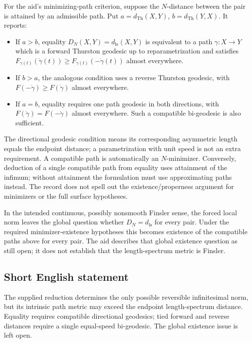 \documentclass[11pt]{article}
\begin{document}
For the aid's minimizing-path criterion, suppose the \(N\)-distance between the pair is attained by an admissible path. Put \(a=d_{\mathrm{Th}}(X,Y)\), \(b=d_{\mathrm{Th}}(Y,X)\). It reports:
\begin{itemize}
\item If \(a>b\), equality \(D_N(X,Y)=d_{\mathrm{ls}}(X,Y)\) is equivalent to a path \(\gamma:X\to Y\) which is a forward Thurston geodesic up to reparametrization and satisfies \(F_{\gamma(t)}(\dot\gamma(t))\geq F_{\gamma(t)}(-\dot\gamma(t))\) almost everywhere.
\item If \(b>a\), the analogous condition uses a reverse Thurston geodesic, with \(F(-\dot\gamma)\geq F(\dot\gamma)\) almost everywhere.
\item If \(a=b\), equality requires one path geodesic in both directions, with \(F(\dot\gamma)=F(-\dot\gamma)\) almost everywhere. Such a compatible bi-geodesic is also sufficient.
\end{itemize}
The directional geodesic condition means its corresponding asymmetric length equals the endpoint distance; a parametrization with unit speed is not an extra requirement. A compatible path is automatically an \(N\)-minimizer. Conversely, deduction of a single compatible path from equality uses attainment of the infimum; without attainment the formulation must use approximating paths instead. The record does not spell out the existence/properness argument for minimizers or the full surface hypotheses.

In the intended continuous, possibly nonsmooth Finsler sense, the forced local norm leaves the global question whether \(D_N=d_{\mathrm{ls}}\) for every pair. Under the required minimizer-existence hypotheses this becomes existence of the compatible paths above for every pair. The aid describes that global existence question as still open; it does not establish that the length-spectrum metric is Finsler.
\subsection{Short English statement}
The supplied reduction determines the only possible reversible infinitesimal norm, but its intrinsic path metric may exceed the endpoint length-spectrum distance. Equality requires compatible directional geodesics; tied forward and reverse distances require a single equal-speed bi-geodesic. The global existence issue is left open.
\end{document}
